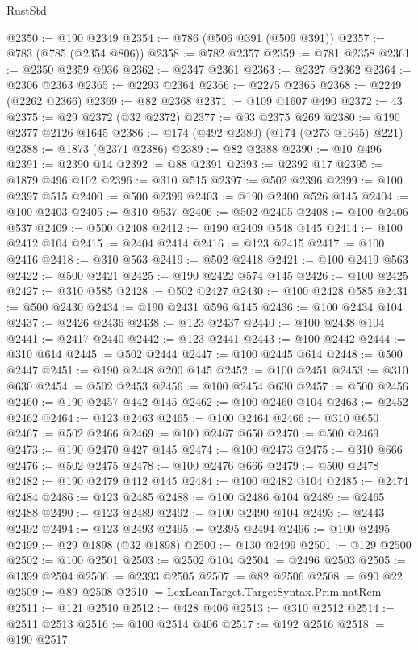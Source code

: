 \begin{lexlean}{RustStd}
\begin{coremodule}
@2350 := @190 @2349
@2354 := @786 (@506 @391 (@509 @391))
@2357 := @783 (@785 (@2354 @806))
@2358 := @782 @2357
@2359 := @781 @2358
@2361 := @2350 @2359 @936
@2362 := @2347 @2361
@2363 := @2327 @2362
@2364 := @2306 @2363
@2365 := @2293 @2364
@2366 := @2275 @2365
@2368 := @2249 (@2262 @2366)
@2369 := @82 @2368
@2371 := @109 @1607 @490
@2372 := 43
@2375 := @29 @2372 (@32 @2372)
@2377 := @93 @2375 @269
@2380 := @190 @2377 @2126 @1645
@2386 := @174 (@492 @2380) (@174 (@273 @1645) @221)
@2388 := @1873 (@2371 @2386)
@2389 := @82 @2388
@2390 := @10 @496
@2391 := @2390 @14
@2392 := @88 @2391
@2393 := @2392 @17
@2395 := @1879 @496 @102
@2396 := @310 @515
@2397 := @502 @2396
@2399 := @100 @2397 @515
@2400 := @500 @2399
@2403 := @190 @2400 @526 @145
@2404 := @100 @2403
@2405 := @310 @537
@2406 := @502 @2405
@2408 := @100 @2406 @537
@2409 := @500 @2408
@2412 := @190 @2409 @548 @145
@2414 := @100 @2412 @104
@2415 := @2404 @2414
@2416 := @123 @2415
@2417 := @100 @2416
@2418 := @310 @563
@2419 := @502 @2418
@2421 := @100 @2419 @563
@2422 := @500 @2421
@2425 := @190 @2422 @574 @145
@2426 := @100 @2425
@2427 := @310 @585
@2428 := @502 @2427
@2430 := @100 @2428 @585
@2431 := @500 @2430
@2434 := @190 @2431 @596 @145
@2436 := @100 @2434 @104
@2437 := @2426 @2436
@2438 := @123 @2437
@2440 := @100 @2438 @104
@2441 := @2417 @2440
@2442 := @123 @2441
@2443 := @100 @2442
@2444 := @310 @614
@2445 := @502 @2444
@2447 := @100 @2445 @614
@2448 := @500 @2447
@2451 := @190 @2448 @200 @145
@2452 := @100 @2451
@2453 := @310 @630
@2454 := @502 @2453
@2456 := @100 @2454 @630
@2457 := @500 @2456
@2460 := @190 @2457 @442 @145
@2462 := @100 @2460 @104
@2463 := @2452 @2462
@2464 := @123 @2463
@2465 := @100 @2464
@2466 := @310 @650
@2467 := @502 @2466
@2469 := @100 @2467 @650
@2470 := @500 @2469
@2473 := @190 @2470 @427 @145
@2474 := @100 @2473
@2475 := @310 @666
@2476 := @502 @2475
@2478 := @100 @2476 @666
@2479 := @500 @2478
@2482 := @190 @2479 @412 @145
@2484 := @100 @2482 @104
@2485 := @2474 @2484
@2486 := @123 @2485
@2488 := @100 @2486 @104
@2489 := @2465 @2488
@2490 := @123 @2489
@2492 := @100 @2490 @104
@2493 := @2443 @2492
@2494 := @123 @2493
@2495 := @2395 @2494
@2496 := @100 @2495
@2499 := @29 @1898 (@32 @1898)
@2500 := @130 @2499
@2501 := @129 @2500
@2502 := @100 @2501
@2503 := @2502 @104
@2504 := @2496 @2503
@2505 := @1399 @2504
@2506 := @2393 @2505
@2507 := @82 @2506
@2508 := @90 @22
@2509 := @89 @2508
@2510 := LexLeanTarget.TargetSyntax.Prim.natRem
@2511 := @121 @2510
@2512 := @428 @406
@2513 := @310 @2512
@2514 := @2511 @2513
@2516 := @100 @2514 @406
@2517 := @192 @2516
@2518 := @190 @2517

\end{coremodule}
\end{lexlean}

